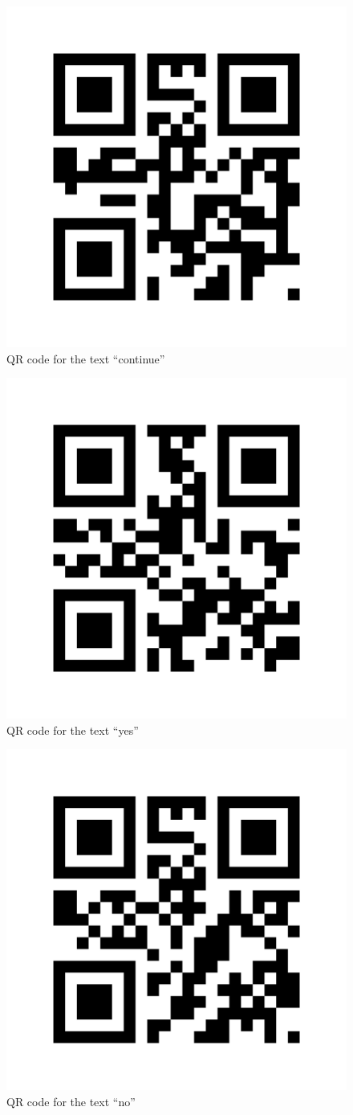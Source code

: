 \begin{figure}[tbp]
	\centering
	\includegraphics[width=0.5\columnwidth]{continue.png}
	\caption{QR code for the text ``continue''}
	\label{fig:qr_continue}
\end{figure}
\begin{figure}[tbp]
	\centering
	\includegraphics[width=0.5\columnwidth]{yes.png}
	\caption{QR code for the text ``yes''}
	\label{fig:qr_yes}
\end{figure}
\begin{figure}[tbp]
	\centering
	\includegraphics[width=0.5\columnwidth]{no.png}
	\caption{QR code for the text ``no''}
	\label{fig:qr_no}
\end{figure}
